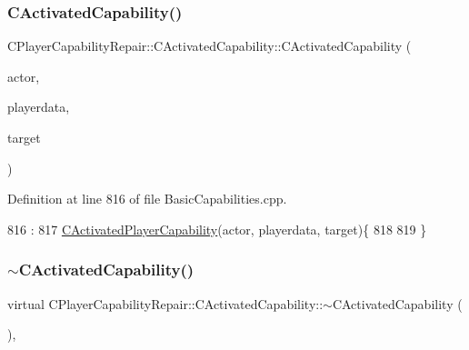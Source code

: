 \subsubsection{\texorpdfstring{C\+Activated\+Capability()}{CActivatedCapability()}}
{\footnotesize\ttfamily C\+Player\+Capability\+Repair\+::\+C\+Activated\+Capability\+::\+C\+Activated\+Capability (\begin{DoxyParamCaption}\item[{std\+::shared\+\_\+ptr$<$ \hyperlink{classCPlayerAsset}{C\+Player\+Asset} $>$}]{actor,  }\item[{std\+::shared\+\_\+ptr$<$ \hyperlink{classCPlayerData}{C\+Player\+Data} $>$}]{playerdata,  }\item[{std\+::shared\+\_\+ptr$<$ \hyperlink{classCPlayerAsset}{C\+Player\+Asset} $>$}]{target }\end{DoxyParamCaption})}



Definition at line 816 of file Basic\+Capabilities.\+cpp.


\begin{DoxyCode}
816                                                                                                            
                                                                               :
817 \hyperlink{classCActivatedPlayerCapability_a1ece00ffb6a7b925c84dd94a7407a0d1}{CActivatedPlayerCapability}(actor, playerdata, target)\{
818 
819 \}
\end{DoxyCode}
\hypertarget{classCPlayerCapabilityRepair_1_1CActivatedCapability_ae4c632553e0898f8501a3f6bcd71cfaa}{}\label{classCPlayerCapabilityRepair_1_1CActivatedCapability_ae4c632553e0898f8501a3f6bcd71cfaa} 
\subsubsection{\texorpdfstring{$\sim$\+C\+Activated\+Capability()}{~CActivatedCapability()}}
{\footnotesize\ttfamily virtual C\+Player\+Capability\+Repair\+::\+C\+Activated\+Capability\+::$\sim$\+C\+Activated\+Capability (\begin{DoxyParamCaption}{ }\end{DoxyParamCaption})\hspace{0.3cm}{\ttfamily [inline]}, {\ttfamily [virtual]}}



